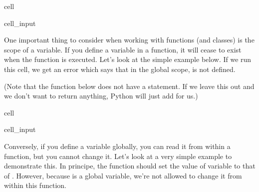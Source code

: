 \documentclass[letterpaper,10pt,english]{jupyterBook}
\begin{document}
\begin{sphinxuseclass}{cell}\begin{sphinxVerbatimInput}

\begin{sphinxuseclass}{cell_input}
\begin{sphinxVerbatim}[commandchars=\\\{\}]
 
       
             
         
    
\end{sphinxVerbatim}

\end{sphinxuseclass}\end{sphinxVerbatimInput}

\end{sphinxuseclass}
\sphinxAtStartPar
One important thing to consider when working with functions (and classes) is the scope of a variable. If you define a variable in a function, it will cease to exist when the function is executed. Let’s look at the simple example below. If we run this cell, we get an error which says that in the global scope,  is not defined.

\sphinxAtStartPar
(Note that the function below does not have a  statement. If we leave this out and we don’t want to return anything, Python will just add  for us.)

\begin{sphinxuseclass}{cell}\begin{sphinxVerbatimInput}

\begin{sphinxuseclass}{cell_input}
\begin{sphinxVerbatim}[commandchars=\\\{\}]
 
      

\end{sphinxVerbatim}

\end{sphinxuseclass}\end{sphinxVerbatimInput}

\end{sphinxuseclass}
\sphinxAtStartPar
Conversely, if you define a variable globally, you can read it from within a function, but you cannot change it. Let’s look at a very simple example to demonstrate this. In principe, the function  should set the value of variable  to that of . However, because  is a global variable, we’re not allowed to change it from within this function.
\end{document}
